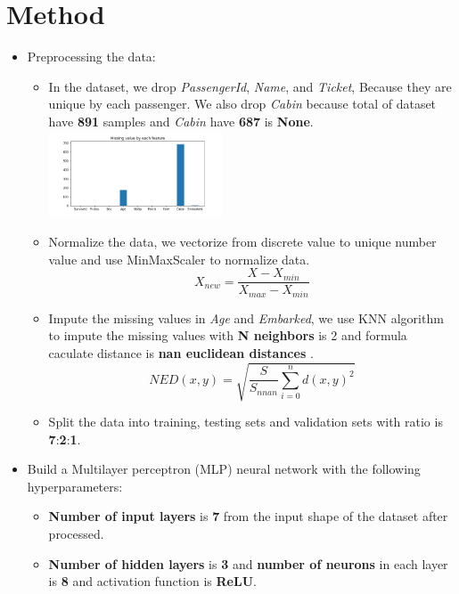 \documentclass{article}
\begin{document}
\section{Method}

\begin{itemize}
    \item Preprocessing the data:
        \begin{itemize}
            \item In the dataset, we drop \textit{PassengerId}, \textit{Name}, and \textit{Ticket},
            Because they are unique by each passenger.
            We also drop \textit{Cabin} because total of dataset have \textbf{891} samples and \textit{Cabin} have \textbf{687} is \textbf{None}.
            \includegraphics[width=0.425\textwidth]{missing.png}   
            \item Normalize the data, we vectorize from discrete value to unique number value and use MinMaxScaler to normalize data.
            \[
               X_{new} = \frac{X - X_{min}}{X_{max} - X_{min}}
            \]
            \item Impute the missing values in \textit{Age} and \textit{Embarked},
            we use KNN algorithm to impute the missing values with \textbf{N neighbors} is 2 and formula caculate distance is \textbf{nan euclidean distances} .
            \[
            NED(x,y) = \sqrt{\frac{S}{S_{nnan}} \sum^n_{i=0} d(x,y)^2 }  
            \]
            \item Split the data into training, testing sets and validation sets with ratio is \textbf{7}:\textbf{2}:\textbf{1}.
        \end{itemize}
    \item Build a Multilayer perceptron (MLP) neural network with the following hyperparameters:
        \begin{itemize}
            \item \textbf{Number of input layers} is \textbf{7} from the input shape of the dataset after processed.
            \item \textbf{Number of hidden layers} is \textbf{3} and \textbf{number of neurons} in each layer is \textbf{8} and activation function is \textbf{ReLU}.

\end{itemize}
\end{itemize}
\end{document}
